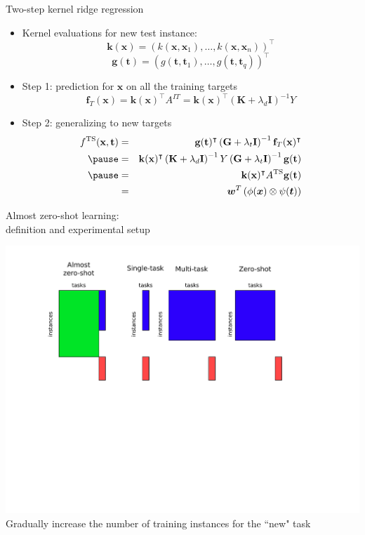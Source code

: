 \documentclass[]{beamer}
\newcommand{\osize}{n}
\newcommand{\qsize}{q}
\newcommand{\kernelf}{k}
\newcommand{\gkernelf}{g}
\newcommand{\dkernelm}{\bm{K}}
\newcommand{\tkernelm}{\bm{G}}
\newcommand{\regparam}{\lambda}
\newcommand{\idmatrix}{\bm{I}}
\newcommand{\transpose}{^\intercal}
\newcommand{\bm}[1]{\mathbf{#1}}
\newcommand{\predfun}{f}
\newcommand{\taskset}{T}
\renewcommand{\vec}[1]{\boldsymbol{#1}}
\begin{document}
\begin{frame}{Two-step kernel ridge regression}

\vspace{0.6cm}
\begin{itemize}
\item Kernel evaluations for new test instance: 
$$\bm{k}(\bm{x})=\left(\kernelf(\bm{x},\bm{x}_1),\ldots,\kernelf(\bm{x},\bm{x}_\osize)\right)\transpose$$ 
$$\bm{g}(\bm{t})=\left(\gkernelf(\bm{t},\bm{t}_1),\ldots,\gkernelf(\bm{t},\bm{t}_\qsize)\right)\transpose$$ \pause 
\item Step 1: prediction for $\bm{x}$ on all the training targets
$$
\mathbf{\predfun}_\taskset (\bm{x}) = \bm{k}(\bm{x})\transpose A^{IT} = \bm{k}(\bm{x})\transpose \left(\dkernelm+\regparam_d \idmatrix\right)^{-1} Y  $$ \pause 
\item Step 2: generalizing to new targets
\begin{eqnarray*}
\predfun^\text{TS}(\bm{x}, \bm{t}) &=&  \bm{g}(\bm{t})\transpose \left(\tkernelm+\regparam_t \idmatrix\right)^{-1}  \mathbf{\predfun}_\taskset (\bm{x})\transpose \\ \pause 
&=& \bm{k}(\bm{x})\transpose \left(\dkernelm+\regparam_d \idmatrix\right)^{-1} Y  \left(\tkernelm+\regparam_t \idmatrix\right)^{-1} \bm{g}(\bm{t}) \\ \pause 
&=& \bm{k}(\bm{x})\transpose A^\text{TS} \bm{g}(\bm{t}) \\
&=& \vec{w}^T \left(\phi(\vec{x}) \otimes \psi(\vec{t}) \right)
\end{eqnarray*}
\end{itemize}
\end{frame}





\begin{frame}{Almost zero-shot learning: \\
definition and experimental setup}
 \center

   \includegraphics[width=\textwidth]{Figures/relationMatrices} \\
	
	Gradually increase the number of training instances for the ``new" task 
\end{frame}
\end{document}
